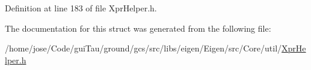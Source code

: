 Definition at line 183 of file Xpr\-Helper.\-h.



The documentation for this struct was generated from the following file\-:\begin{DoxyCompactItemize}
\item 
/home/jose/\-Code/gui\-Tau/ground/gcs/src/libs/eigen/\-Eigen/src/\-Core/util/\hyperlink{_xpr_helper_8h}{Xpr\-Helper.\-h}\end{DoxyCompactItemize}
